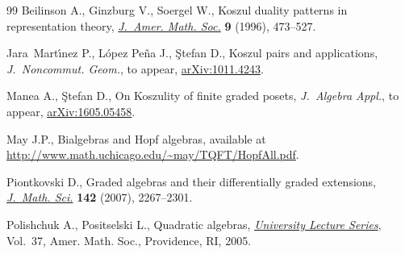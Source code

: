 \documentclass[11pt]{article}
\renewcommand{\^}[1]{\mbox{$^{\left( #1 \right)}$}}
\renewcommand{\_}[1]{\mbox{$_{\left( #1 \right)}$}}
\numberwithin{equation}{section}
\begin{document}
\begin{thebibliography}{99}
Beilinson A., Ginzburg V., Soergel W., Koszul duality patterns in
 representation theory, \href{http://dx.doi.org/10.1090/S0894-0347-96-00192-0}{\textit{J.~Amer. Math. Soc.}} \textbf{9} (1996),
 473--527.

Jara~Mart\'{\i}nez P., L\'opez Pe\~na J., \c{S}tefan D., Koszul pairs and
 applications, \textit{J.~Noncommut. Geom.}, {t}o appear, \href{http://arxiv.org/abs/1011.4243}{arXiv:1011.4243}.

Manea A., \c{S}tefan D., On Koszulity of f\/inite graded posets,
 \textit{J.~Algebra Appl.}, {t}o appear, \href{http://arxiv.org/abs/1605.05458}{arXiv:1605.05458}.

May J.P., Bialgebras and {H}opf algebras, available at
 \url{http://www.math.uchicago.edu/~may/TQFT/HopfAll.pdf}.

Piontkovski D., Graded algebras and their dif\/ferentially graded extensions,
 \href{http://dx.doi.org/10.1007/s10958-007-0137-y}{\textit{J.~Math. Sci.}} \textbf{142} (2007), 2267--2301.

Polishchuk A., Positselski L., Quadratic algebras, \href{http://dx.doi.org/10.1090/ulect/037}{\textit{University Lecture
 Series}}, Vol.~37, Amer. Math. Soc., Providence, RI, 2005.

\end{thebibliography}
\end{document}
